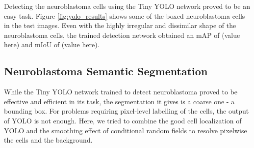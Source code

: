 \documentclass[journal]{IEEEtran}
\begin{document}
Detecting the neuroblastoma cells using the Tiny YOLO network proved to be an easy task. Figure \ref{fig:yolo_results} shows some of the boxed neuroblastoma cells in the test images.
Even with the highly irregular and dissimilar shape of the neuroblastoma cells, the trained detection network obtained an mAP of (value here) and mIoU of (value here).
\subsection{Neuroblastoma Semantic Segmentation}
While the Tiny YOLO network trained to detect neuroblastoma proved to be effective and efficient in its task, the segmentation it gives is a coarse one - a bounding box. For problems requiring pixel-level labelling of the cells, the output of YOLO is not enough. Here, we tried to combine the good cell localization of YOLO and the smoothing effect of conditional random fields to resolve pixelwise the cells and the background.
\end{document}
